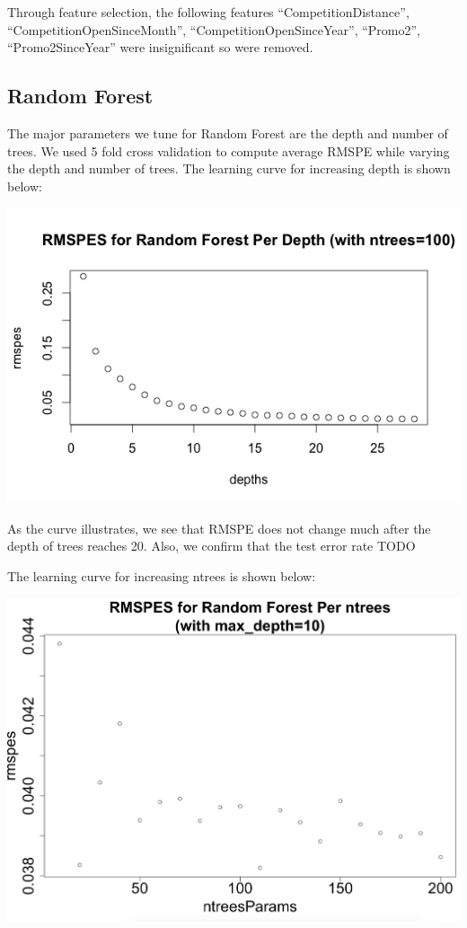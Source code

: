 \documentclass[letterpaper,twocolumn,11pt]{article}
\begin{document}
Through feature selection, the following features ``CompetitionDistance'', ``CompetitionOpenSinceMonth'', ``CompetitionOpenSinceYear'', ``Promo2'', ``Promo2SinceYear'' were insignificant so were removed.

\subsection{Random Forest}
The major parameters we tune for Random Forest are the depth and number of trees. We used 5 fold cross validation to compute average RMSPE while varying the depth and number of trees. The learning curve for increasing depth is shown below:

\includegraphics[scale=0.4]{img/RandomForestPerDepth.png}

As the curve illustrates, we see that RMSPE does not change much after the depth of trees reaches 20. Also, we confirm that the test error rate TODO

The learning curve for increasing ntrees is shown below:

\includegraphics[scale=0.22]{img/RandomForestPerNtrees.png}
\end{document}
